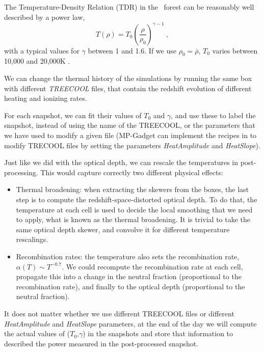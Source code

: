 The Temperature-Density Relation (TDR) in the \lya\ forest can be reasonably
well described by a power law, 
\begin{equation}
 T(\rho) = T_0 \left(\frac{\rho}{\rho_0}\right)^{\gamma-1} ~,
\end{equation}
with a typical values for $\gamma$ between 1 and 1.6. 
If we use $\rho_0 = \bar \rho$, $T_0$ varies between 10,000 and 20,000K
\cite{Lukic2015}.

We can change the thermal history of the simulations by running the same box
with different \textit{TREECOOL} files, that contain the redshift evolution
of different heating and ionizing rates.

For each snapshot, we can fit their values of $T_0$ and $\gamma$, and use 
these to label the snapshot, instead of using the name of the TREECOOL, 
or the parameters that we have used to modify a given file 
(MP-Gadget can implement the recipes in \cite{Bolton2008} to modify TRECOOL
files by setting the parameters \textit{HeatAmplitude} and \textit{HeatSlope}).

Just like we did with the optical depth, we can rescale the temperatures in 
post-processing. 
This would capture correctly two different physical effects:
\begin{itemize}
 \item Thermal broadening: when extracting the skewers from the boxes, 
  the last step is to compute the redshift-space-distorted optical depth. 
  To do that, the temperature at each cell is used to decide the local 
  smoothing that we need to apply, what is known as the thermal broadening. 
  It is trivial to take the same optical depth skewer, and convolve it for
  different temperature rescalings.
 \item Recombination rates: the temperature also sets the recombination rate,
  $\alpha(T) \sim T^{-0.7}$. 
  We could recompute the recombination rate at each cell, 
  propagate this into a change in the neutral fraction (proportional to the 
  recombination rate), and finally to the optical depth (proportional to the 
  neutral fraction).
\end{itemize}

It does not matter whether we use different TREECOOL files or different
\textit{HeatAmplitude} and \textit{HeatSlope} parameters, at the end of the
day we will compute the actual values of ($T_0$,$\gamma$) in the snapshots
and store that information to described the power measured in the
post-processed snapshot.


